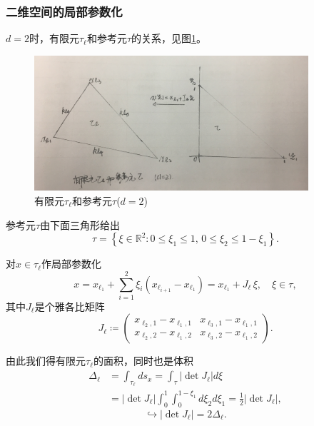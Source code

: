 \subsubsection{二维空间的局部参数化}
$d=2$时，有限元$\tau_{\ell}$和参考元$\tau$的关系，见图\ref{fig:finele-ref-finele-refele}。

\begin{figure}[htbp]
  \centering
  \includegraphics[width=4in]{./Figures/20171210-finele-refele}
 \caption{有限元$\tau_{\ell}$和参考元$\tau$($d=2$)}
\label{fig:finele-ref-finele-refele}

\end{figure}

参考元$\tau$由下面三角形给出
\begin{equation}
  \label{eq:finele-ref-d2-refele-def}
  \tau = \left\{
  \xi \in \mathbb{R}^{2}: 0 \le \xi_{1} \le 1, \, 0 \le \xi_{2} \le 1 - \xi_{1} \right\}.
\end{equation}

对$x \in \tau_{\ell}$作局部参数化
\begin{equation*}
  x = x_{\ell_{1}} + \sum_{i=1}^{2} \xi_{i} \left( x_{\ell_{i+1}} - x_{\ell_{1}} \right) = x_{\ell_{1}} + J_{\ell} \, \xi, \quad \xi \in \tau,
\end{equation*}
其中$J_{\ell}$是个雅各比矩阵
\begin{equation*}
  J_{\ell} \coloneqq
  \begin{pmatrix}
    x_{\ell_{2}, 1} - x_{\ell_{1}, 1} &
    x_{\ell_{3}, 1} - x_{\ell_{1}, 1} \\
    x_{\ell_{2}, 2} - x_{\ell_{1}, 2} &
    x_{\ell_{3}, 2} - x_{\ell_{1}, 2}
  \end{pmatrix}.
\end{equation*}

由此我们得有限元$\tau_{\ell}$的面积，同时也是体积
\begin{equation*}
\begin{split}
    \Delta_{\ell} & = \int_{\tau_{\ell}} d s_{x} = \int_{\tau} \left| \det J_{\ell} \right| d \xi \\
    & = \left| \det J_{\ell} \right| \int_{0}^{1} \int_{0}^{1-\xi_{1}} d \xi_{2} d \xi_{1} = \frac{1}{2} \left| \det J_{\ell} \right|,
\end{split}
\end{equation*}
\begin{equation}
  \label{eq:finele-ref-d2-volume-matrix-determinant}
  \hookrightarrow \left| \det J_{\ell} \right| = 2 \Delta_{\ell}.
\end{equation}


